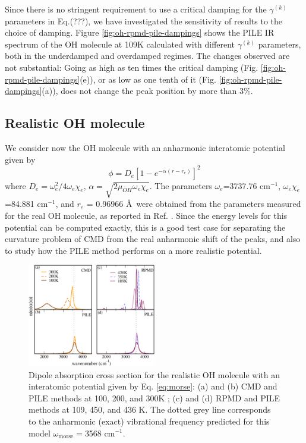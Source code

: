 \documentclass[aps,prb,superscriptaddress,amsmath,amssymb,showpacs,twocolumn]{revtex4}
\begin{document}
Since there is no stringent requirement to use a critical damping for the 
$\gamma^{(k)}$ parameters in Eq.(???), we have investigated the sensitivity of 
results to the choice of damping. Figure \ref{fig:oh-rpmd-pile-dampings} 
shows the PILE IR spectrum of the OH molecule at 109K calculated with different
$\gamma^{(k)}$ parameters, both in the underdamped and overdamped regimes. 
The changes observed are not substantial: Going as high as ten times the critical 
damping (Fig. \ref{fig:oh-rpmd-pile-dampings}(e)), or as low
as one tenth of it (Fig. \ref{fig:oh-rpmd-pile-dampings}(a)), does not change 
the peak position by more than 3\%. 


\subsection{Realistic OH molecule}


We consider now the OH molecule 
with an anharmonic interatomic potential given by
%
\begin{equation}
\phi = D_{e} \left[ 1-e^{-\alpha(r-r_{e})}\right]^2 
\label{eq:morse}
\end{equation}
%
 where $D_{e} = \omega_e^2/4\omega_e\chi_e$, $\alpha=\sqrt{2\mu_{OH}\omega_e\chi_e}$. The 
parameters $\omega_e$=3737.76 cm$^{-1}$, $\omega_e \chi_e$=84.881 cm$^{-1}$, and $r_{e}$ = 0.96966 \AA\, 
were obtained from the parameters measured for the real OH molecule, as reported in Ref. \cite{HerzbergBook}.
Since the energy levels for this potential can be computed exactly, this is a good test case for 
separating the curvature problem of CMD from the real anharmonic shift of the peaks, 
and also to study how the PILE method performs on a more realistic potential.

\begin{figure}[htbp]
\centering
\includegraphics[width=0.5\textwidth]{figures/comparison_ohanharm_factors.pdf}
\caption{Dipole absorption cross section for the realistic OH molecule with an interatomic 
potential given by Eq. \ref{eq:morse}: (a) and (b) CMD and PILE methods at 100, 200, 
and 300K ; (c)  and (d) RPMD and PILE methods at 109, 450, and 436 K. The dotted grey line corresponds to the 
anharmonic (exact) vibrational frequency predicted for this model $\omega_\text{morse}=$3568 cm$^{-1}$.}
\label{fig:ohreal-rpmd-cmd-pile}
\end{figure}
\end{document}
